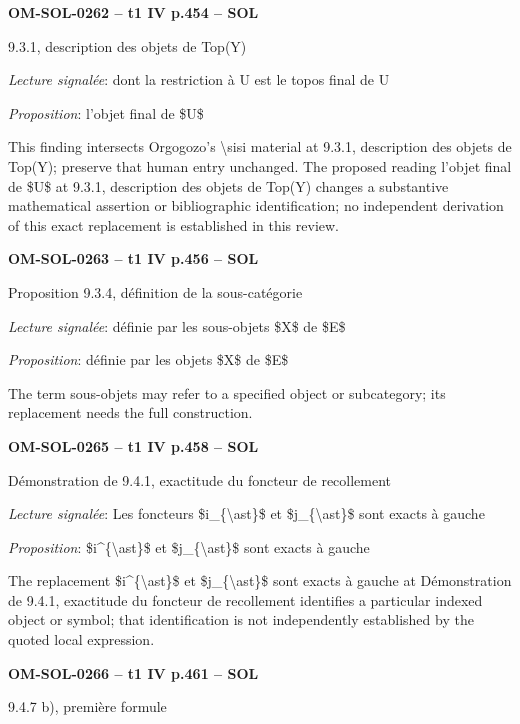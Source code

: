 \par\noindent\textbf{OM-SOL-0262 -- t1 IV p.454 -- SOL}\par
9.3.1, description des objets de Top(Y)\par
\emph{Lecture signalée}: dont la restriction à U est le topos final de U\par
\emph{Proposition}: l'objet final de \$U\$\par
This finding intersects Orgogozo's \textbackslash{}sisi material at 9.3.1, description des objets de Top(Y); preserve that human entry unchanged. The proposed reading l'objet final de \$U\$ at 9.3.1, description des objets de Top(Y) changes a substantive mathematical assertion or bibliographic identification; no independent derivation of this exact replacement is established in this review.\par
\par\noindent\textbf{OM-SOL-0263 -- t1 IV p.456 -- SOL}\par
Proposition 9.3.4, définition de la sous-catégorie\par
\emph{Lecture signalée}: définie par les sous-objets \$X\$ de \$E\$\par
\emph{Proposition}: définie par les objets \$X\$ de \$E\$\par
The term sous-objets may refer to a specified object or subcategory; its replacement needs the full construction.\par
\par\noindent\textbf{OM-SOL-0265 -- t1 IV p.458 -- SOL}\par
Démonstration de 9.4.1, exactitude du foncteur de recollement\par
\emph{Lecture signalée}: Les foncteurs \$i\_\{\textbackslash{}ast\}\$ et \$j\_\{\textbackslash{}ast\}\$ sont exacts à gauche\par
\emph{Proposition}: \$i\textasciicircum{}\{\textbackslash{}ast\}\$ et \$j\_\{\textbackslash{}ast\}\$ sont exacts à gauche\par
The replacement \$i\textasciicircum{}\{\textbackslash{}ast\}\$ et \$j\_\{\textbackslash{}ast\}\$ sont exacts à gauche at Démonstration de 9.4.1, exactitude du foncteur de recollement identifies a particular indexed object or symbol; that identification is not independently established by the quoted local expression.\par
\par\noindent\textbf{OM-SOL-0266 -- t1 IV p.461 -- SOL}\par
9.4.7 b), première formule\par
